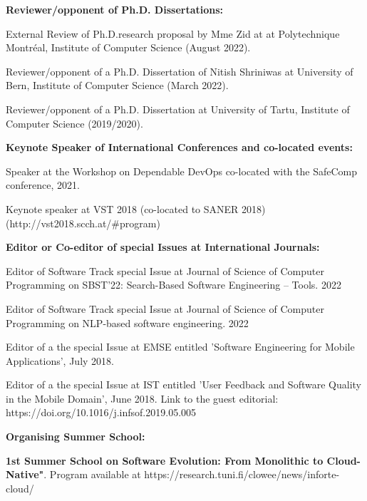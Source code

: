 \documentclass[10pt]{article}
\begin{document}
\textbf{Reviewer/opponent of Ph.D. Dissertations:}
\begin{innerlist}
\item External Review of Ph.D.research proposal   by Mme Zid at at Polytechnique Montréal, Institute of Computer Science (August 2022). \\
\item Reviewer/opponent of a Ph.D. Dissertation   of Nitish Shriniwas at University of Bern, Institute of Computer Science (March 2022). \\
\item Reviewer/opponent of a Ph.D. Dissertation  at University of Tartu, Institute of Computer Science (2019/2020). \\
	\end{innerlist}

\textbf{Keynote Speaker of International Conferences and co-located events:}
\begin{innerlist}
\item Speaker at the Workshop on Dependable DevOps co-located with the SafeComp conference, 2021.\\
\item Keynote speaker at VST 2018 (co-located to SANER 2018) \\(http://vst2018.scch.at/\#program) 
	\\
\end{innerlist}

\textbf{Editor or Co-editor of special Issues at International Journals:}
\begin{innerlist}
 \item Editor of Software Track special Issue at Journal of Science of Computer Programming on SBST’22: Search-Based Software Engineering – Tools. 2022
\item Editor of Software Track special Issue at Journal of Science of Computer Programming on NLP-based software engineering. 2022
\item Editor of a the special Issue at EMSE entitled 'Software Engineering for Mobile Applications', July 2018.
\item Editor of a the special Issue at IST entitled 'User Feedback and Software Quality in the Mobile Domain',  June 2018. Link to the guest editorial:\\ https://doi.org/10.1016/j.infsof.2019.05.005
	\\
\end{innerlist}

\textbf{Organising Summer School:}
\begin{innerlist}
\item \textbf{1st Summer School on Software Evolution: From Monolithic to Cloud-Native"}. Program available at https://research.tuni.fi/clowee/news/inforte-cloud/ 
	\\
\end{innerlist}
\end{document}
